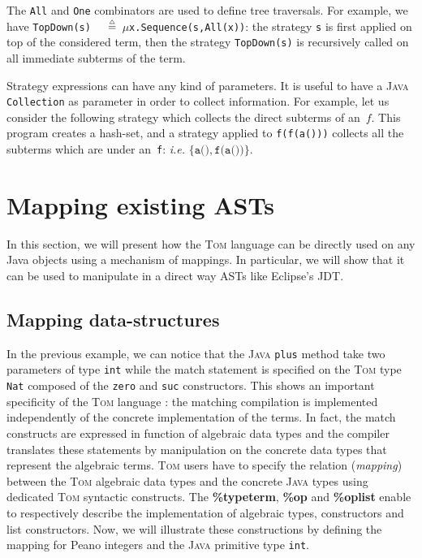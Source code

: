 \documentclass[runningheads]{llncs}
\newcommand{\tom}{\textsc{Tom}}
\newcommand{\java}{\textsc{Java}}
\newcommand{\lex}[1]{{\textrm{\textbf{#1}}}}
\newcommand{\isdef}{\mathrel{\mbox{\small$\stackrel{\mbox{\tiny$\triangle$}}{=}$}}}
\newcommand{\Mu}{{\ensuremath{\mu}}}
\newcommand{\ie}{\textit{i.e.}}
\begin{document}
The \texttt{All} and \texttt{One} combinators are used to define tree
traversals. For example, we have
\texttt{TopDown(s)}~${\isdef}$~$\Mu$\texttt{x.Sequence(s,All(x))}:
the strategy
 \texttt{s} is first applied on top of the considered term, then
the strategy \texttt{TopDown(s)} is recursively called on all immediate
subterms of the term.

Strategy expressions can have any kind of parameters. It is useful to have a
{\java} \texttt{Collection} as parameter in order to collect information.  For
example, let us consider the following strategy which collects the direct
subterms of an~$f$.  This program creates a hash-set, and a strategy applied to
\texttt{f(f(a()))} collects all the subterms which are under an~\texttt{f}:
{\ie} $\{\texttt{a()}, \texttt{f(a())}\}$.


\section{Mapping existing ASTs}

In this section, we will present how the {\tom} language can be directly used
on any Java objects using a mechanism of mappings. In particular, we will show
that it can be used to manipulate in a direct way ASTs like Eclipse's JDT.

\subsection{Mapping data-structures}

In the previous example, we can notice that the {\java} \texttt{plus} method
take two parameters of type \texttt{int} while the match statement is specified
on the {\tom} type \texttt{Nat} composed of the \texttt{zero} and \texttt{suc}
constructors. This shows an important specificity of the {\tom} language : the
matching compilation is implemented independently of the concrete
implementation of the terms. In fact, the match constructs are expressed in
function of algebraic data types and the compiler translates these statements
by manipulation on the concrete data types that represent the algebraic terms.
{\tom} users have to specify the relation (\emph{mapping}) between the {\tom}
algebraic data types and the concrete {\java} types using dedicated {\tom}
syntactic constructs. The \lex{\%typeterm}, \lex{\%op} and \lex{\%oplist}
enable to respectively  describe the implementation of algebraic types,
constructors and list constructors. Now, we will illustrate these constructions
by defining the mapping for Peano integers and the {\java} primitive type
\texttt{int}.
\end{document}
